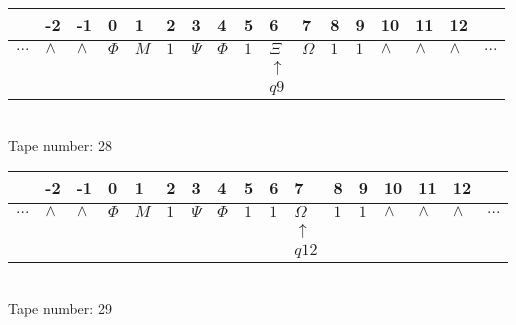 \documentclass{article}
\begin{document}
\begin{table}[H]
\centering
\begin{tabular}{lllllllllllllllll}
 & -2 & -1 & 0 & 1 & 2 & 3 & 4 & 5 & 6 & 7 & 8 & 9 & 10 & 11 & 12 & \\
\hline
$...$ & \multicolumn{1}{|l|}{$\wedge$} & \multicolumn{1}{|l|}{$\wedge$} & \multicolumn{1}{|l|}{$\Phi$} & \multicolumn{1}{|l|}{$M$} & \multicolumn{1}{|l|}{$1$} & \multicolumn{1}{|l|}{$\Psi$} & \multicolumn{1}{|l|}{$\Phi$} & \multicolumn{1}{|l|}{$1$} & \multicolumn{1}{|l|}{$\Xi$} & \multicolumn{1}{|l|}{$\Omega$} & \multicolumn{1}{|l|}{$1$} & \multicolumn{1}{|l|}{$1$} & \multicolumn{1}{|l|}{$\wedge$} & \multicolumn{1}{|l|}{$\wedge$} & \multicolumn{1}{|l|}{$\wedge$} & $...$\\
\hline
&  &  &  &  &  &  &  &  & $\uparrow$ &  &  &  &  &  &  &  \\
&  &  &  &  &  &  &  &  & $ q9 $ &  &  &  &  &  &  &  \\
\end{tabular}
\\
Tape number: 28
\noindent\makebox[\linewidth]{\hdashrule{\textwidth}{1pt}{1pt}}\end{table}

\begin{table}[H]
\centering
\begin{tabular}{lllllllllllllllll}
 & -2 & -1 & 0 & 1 & 2 & 3 & 4 & 5 & 6 & 7 & 8 & 9 & 10 & 11 & 12 & \\
\hline
$...$ & \multicolumn{1}{|l|}{$\wedge$} & \multicolumn{1}{|l|}{$\wedge$} & \multicolumn{1}{|l|}{$\Phi$} & \multicolumn{1}{|l|}{$M$} & \multicolumn{1}{|l|}{$1$} & \multicolumn{1}{|l|}{$\Psi$} & \multicolumn{1}{|l|}{$\Phi$} & \multicolumn{1}{|l|}{$1$} & \multicolumn{1}{|l|}{$1$} & \multicolumn{1}{|l|}{$\Omega$} & \multicolumn{1}{|l|}{$1$} & \multicolumn{1}{|l|}{$1$} & \multicolumn{1}{|l|}{$\wedge$} & \multicolumn{1}{|l|}{$\wedge$} & \multicolumn{1}{|l|}{$\wedge$} & $...$\\
\hline
&  &  &  &  &  &  &  &  &  & $\uparrow$ &  &  &  &  &  &  \\
&  &  &  &  &  &  &  &  &  & $ q12 $ &  &  &  &  &  &  \\
\end{tabular}
\\
Tape number: 29
\noindent\makebox[\linewidth]{\hdashrule{\textwidth}{1pt}{1pt}}\end{table}
\clearpage
\end{document}
